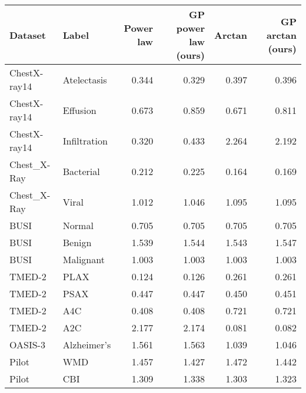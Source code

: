 \begin{tabular}{llrrrr}
\toprule
     Dataset &        Label &  Power law &  GP power law (ours) &  Arctan &  GP arctan (ours) \\
\midrule
ChestX-ray14 &  Atelectasis &      0.344 &                0.329 &   0.397 &             0.396 \\
ChestX-ray14 &     Effusion &      0.673 &                0.859 &   0.671 &             0.811 \\
ChestX-ray14 & Infiltration &      0.320 &                0.433 &   2.264 &             2.192 \\
 Chest\_X-Ray &    Bacterial &      0.212 &                0.225 &   0.164 &             0.169 \\
 Chest\_X-Ray &        Viral &      1.012 &                1.046 &   1.095 &             1.095 \\
        BUSI &       Normal &      0.705 &                0.705 &   0.705 &             0.705 \\
        BUSI &       Benign &      1.539 &                1.544 &   1.543 &             1.547 \\
        BUSI &    Malignant &      1.003 &                1.003 &   1.003 &             1.003 \\
      TMED-2 &         PLAX &      0.124 &                0.126 &   0.261 &             0.261 \\
      TMED-2 &         PSAX &      0.447 &                0.447 &   0.450 &             0.451 \\
      TMED-2 &          A4C &      0.408 &                0.408 &   0.721 &             0.721 \\
      TMED-2 &          A2C &      2.177 &                2.174 &   0.081 &             0.082 \\
     OASIS-3 &  Alzheimer’s &      1.561 &                1.563 &   1.039 &             1.046 \\
       Pilot &          WMD &      1.457 &                1.427 &   1.472 &             1.442 \\
       Pilot &          CBI &      1.309 &                1.338 &   1.303 &             1.323 \\
\bottomrule
\end{tabular}
